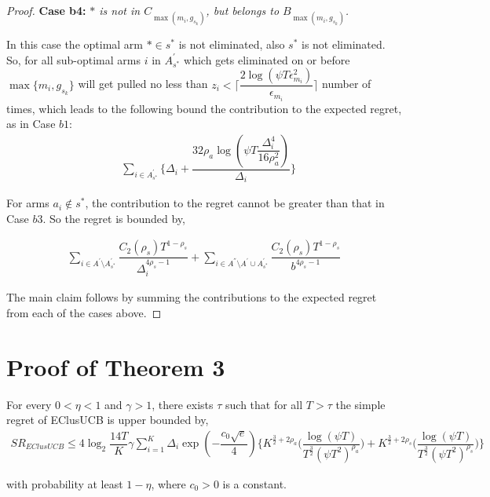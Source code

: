 \begin{proof}
 
\textbf{Case b4:} \textit{${*}$ is not in $C_{\max(m_{i},g_{s_{k}})}$, but belongs to $B_{\max(m_{i},g_{s_{k}})}$.}

In this case the optimal arm ${*}\in s^{*}$ is not eliminated, also $s^{*}$ is not eliminated. So, for all sub-optimal arms $i$ in $A_{s^*}^{'}$ which gets eliminated on or before $\max \lbrace m_{i},g_{s_{k}} \rbrace$ will get pulled no less than $z_{i} < \bigg\lceil\dfrac{2\log{(\psi T\epsilon_{m_{i}}^{2})}}{\epsilon_{m_{i}}}\bigg\rceil$ number of times, which leads to the following bound the contribution to the expected regret, as in Case $b1$:
% 
\begin{align*}
 &\sum_{i\in A_{s^*}^{'}}\bigg\lbrace \Delta_{i}+\dfrac{32\rho_{a}\log{(\psi T\dfrac{\Delta_{i}^{4}}{16\rho_{a}^{2}})}}{\Delta_{i}} \bigg\rbrace 
\end{align*} 

For arms $a_i \notin s^*$, the contribution to the regret cannot be greater than that in Case $b3$. So the regret is bounded by,

\begin{align*}
\sum_{i\in A^{'}\setminus A_{s^*}^{'}}\dfrac{C_{2}(\rho_{s})T^{1-\rho_{s}}}{\Delta_{i}^{4\rho_{s}-1}} +\sum_{i\in A^{''}\setminus A^{'} \cup A_{s^*}^{'}}\dfrac{C_{2}(\rho_{s})T^{1-\rho_{s}}}{b^{4\rho_{s}-1}}
\end{align*}




The main claim follows by summing the contributions to the expected regret from each of the cases above.
\end{proof}

\section{Proof of Theorem 3}
\label{App:SR_EClusUCB}
\begin{theorem}
\label{Result:Theorem:3}

For every $0<\eta <1$ and $\gamma > 1$, there exists $\tau$ such that for all $T>\tau$ the simple regret of EClusUCB is upper bounded by,
\begin{align*}
SR_{EClusUCB} \leq 4\log_{2}\dfrac{14 T}{K}\gamma \sum_{i=1}^{K} \Delta_{i} \exp(-\dfrac{c_{0}\sqrt{e}}{4}) \bigg\lbrace K^{\frac{3}{2} +2\rho_{a}} \bigg(\dfrac{\log (\psi T )}{T^{\frac{3}{2}}(\psi T^2)^{\rho_{a}}}\bigg) + K^{\frac{3}{2} +2\rho_{s}} \bigg(\dfrac{\log (\psi T )}{T^{\frac{3}{2}}(\psi T^2)^{\rho_{s}}}\bigg) \bigg\rbrace
\end{align*}

with probability at least $1-\eta$, where $c_{0}>0$ is a constant.

\end{theorem}


